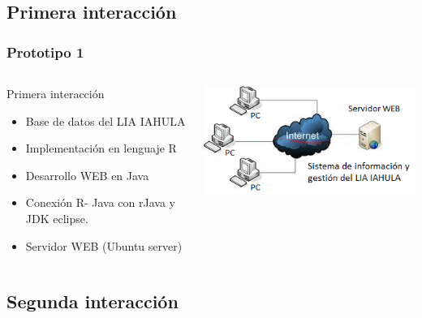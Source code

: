 \documentclass{beamer}%
\begin{document}
\subsection{Primera interacci\'on}
\begin{frame}
\frametitle{\textbf{Prototipo 1}}
\begin{columns}[t]
 \begin{block}{ Primera interacci\'on}
  \begin{itemize}
  	\item Base de datos del LIA IAHULA
  	\item Implementaci\'on en lenguaje R 
  	\item Desarrollo WEB en Java
  	\item Conexi\'on R- Java con rJava y JDK eclipse.
           \item Servidor WEB (Ubuntu server)
  \end{itemize}
  	\end{block}
    \begin{center}\includegraphics[height=0.3\textheight]{wireframe0.png}\end{center}
  \end{columns}
\end{frame}

\subsection{Segunda interacci\'on}
\end{document}
